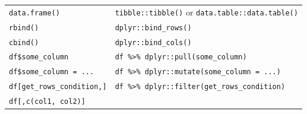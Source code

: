 \documentclass[]{book}
\begin{document}
\begin{longtable}[]{@{}ll@{}}
\begin{minipage}[t]{0.47\columnwidth}\raggedright
\texttt{data.frame()}\strut
\end{minipage} & \begin{minipage}[t]{0.47\columnwidth}\raggedright
\texttt{tibble::tibble()} or \texttt{data.table::data.table()}\strut
\end{minipage}\tabularnewline
\begin{minipage}[t]{0.47\columnwidth}\raggedright
\texttt{rbind()}\strut
\end{minipage} & \begin{minipage}[t]{0.47\columnwidth}\raggedright
\texttt{dplyr::bind\_rows()}\strut
\end{minipage}\tabularnewline
\begin{minipage}[t]{0.47\columnwidth}\raggedright
\texttt{cbind()}\strut
\end{minipage} & \begin{minipage}[t]{0.47\columnwidth}\raggedright
\texttt{dplyr::bind\_cols()}\strut
\end{minipage}\tabularnewline
\begin{minipage}[t]{0.47\columnwidth}\raggedright
\texttt{df\$some\_column}\strut
\end{minipage} & \begin{minipage}[t]{0.47\columnwidth}\raggedright
\texttt{df\ \%\textgreater{}\%\ dplyr::pull(some\_column)}\strut
\end{minipage}\tabularnewline
\begin{minipage}[t]{0.47\columnwidth}\raggedright
\texttt{df\$some\_column\ =\ ...}\strut
\end{minipage} & \begin{minipage}[t]{0.47\columnwidth}\raggedright
\texttt{df\ \%\textgreater{}\%\ dplyr::mutate(some\_column\ =\ ...)}\strut
\end{minipage}\tabularnewline
\begin{minipage}[t]{0.47\columnwidth}\raggedright
\texttt{df{[}get\_rows\_condition,{]}}\strut
\end{minipage} & \begin{minipage}[t]{0.47\columnwidth}\raggedright
\texttt{df\ \%\textgreater{}\%\ dplyr::filter(get\_rows\_condition)}\strut
\end{minipage}\tabularnewline
\begin{minipage}[t]{0.47\columnwidth}\raggedright
\texttt{df{[},c(col1,\ col2){]}}\strut
\end{minipage} & \begin{minipage}[t]{0.47\columnwidth}\raggedright

\end{minipage}
\end{longtable}
\end{document}

